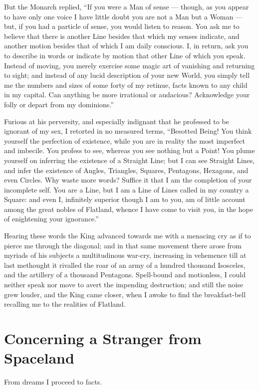 \documentclass[12pt, a4paper, twoside]{memoir}
\begin{document}
But the Monarch replied, ``If you were a Man of sense --- though, as you appear
to have only one voice I have little doubt you are not a Man but a Woman ---
but, if you had a particle of sense, you would listen to reason. You ask me to
believe that there is another Line besides that which my senses indicate, and
another motion besides that of which I am daily conscious. I, in return, ask
you to describe in words or indicate by motion that other Line of which you
speak. Instead of moving, you merely exercise some magic art of vanishing and
returning to sight; and instead of any lucid description of your new World,
you simply tell me the numbers and sizes of some forty of my retinue, facts
known to any child in my capital. Can anything be more irrational or
audacious? Acknowledge your folly or depart from my dominions.''

Furious at his perversity, and especially indignant that he professed to be
ignorant of my sex, I retorted in no measured terms, ``Besotted Being! You
think yourself the perfection of existence, while you are in reality the most
imperfect and imbecile. You profess to see, whereas you see nothing but a
Point! You plume yourself on inferring the existence of a Straight Line; but I
can see Straight Lines, and infer the existence of Angles, Triangles, Squares,
Pentagons, Hexagons, and even Circles. Why waste more words? Suffice it that I
am the completion of your incomplete self. You are a Line, but I am a Line of
Lines called in my country a Square: and even I, infinitely superior though I
am to you, am of little account among the great nobles of Flatland, whence I
have come to visit you, in the hope of enightening your ignorance.''

Hearing these words the King advanced towards me with a menacing cry as if to
pierce me through the diagonal; and in that same movement there arose from
myriads of his subjects a multitudinous war-cry, increasing in vehemence till
at last methought it rivalled the roar of an army of a hundred thousand
Isosceles, and the artillery of a thousand Pentagons. Spell-bound and
motionless, I could neither speak nor move to avert the impending destruction;
and still the noise grew louder, and the King came closer, when I awoke to
find the breakfast-bell recalling me to the realities of Flatland.







\chapter{Concerning a Stranger from Spaceland}
From dreams I proceed to facts.
\end{document}
